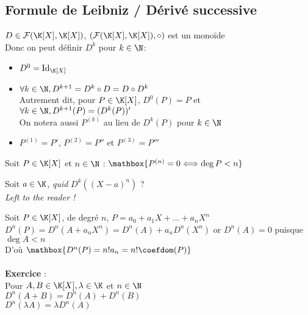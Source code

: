 \documentclass[12pt,a4paper]{report}
\begin{document}
\subsection{Formule de Leibniz / Dérivé successive}
$D \in \mathcal{F}(\K[X], \K[X])$, $(\mathcal{F}(\K[X], \K[X]), \circ)$ est un monoïde\\
Donc on peut définir $D^k$ pour $k \in \N$: 
\begin{itemize}
    \item $D^0 = \mathrm{Id}_{\K[X]}$
    \item $\forall k \in \N, D^{k+1}=D^k \circ D = D \circ D^k$\\
    Autrement dit, pour $P \in \K[X]$, $D^0(P)=P$ et $\forall k \in \N, D^{k+1}(P)=(D^k (P))'$\\
    On notera aussi $P^{(k)}$ au lieu de $D^k (P)$ pour $k \in \N$ 
    \item $P^{(1)}= P'$, $P^{(2)}= P''$ et $P^{(3)}= P'''$
\end{itemize}

\begin{proposition}{}{}
Soit $P \in \K[X]$ et $n\in \N$ : $\mathbox{P^{(n)}=0 \Longleftrightarrow \deg P < n}$
\end{proposition}

\begin{demo}

\end{demo}

\begin{remarque}
Soit $a \in \K$, \textit{quid} $D^k ((X-a)^n)$ ? \\
\textit{Left to the reader !}
\end{remarque}

\begin{application}{}{}
Soit $P \in \K[X]$, de degré $n$, $P = a_0 + a_1 X + ... + a_n X^n $ \\
$D^n (P) = D^n (A + a_n X^n) = D^n (A) + a_n D^n (X^n)$ or $D^n (A) = 0$ puisque $\deg A < n$\\
D'où $\mathbox{D^n (P) = n! a_n = n! \coefdom(P)}$\\
\\
\textbf{Exercice} : \\ 
Pour $A,B \in \K[X], \lambda \in \K$ et $n \in \N$ \\
$D^n (A+B)= D^n (A) + D^n (B) $\\
$D^n (\lambda A) = \lambda D^n (A)$
\end{application}
\pagebreak
\end{document}

